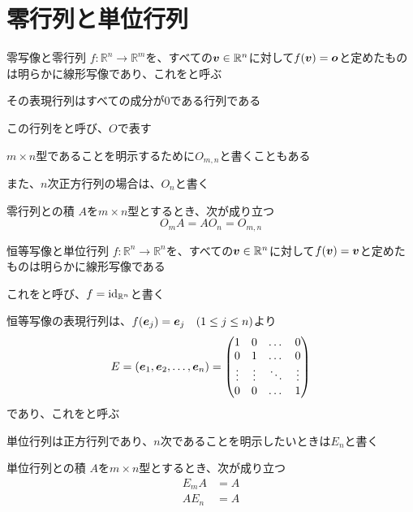 \documentclass[../../../topic_linear-algebra]{subfiles}
\begin{document}
\sectionline
\section{零行列と単位行列}

\begin{mindflow}
\end{mindflow}

\begin{definition*}{零写像と零行列}
  $f\colon \mathbb{R}^n \to \mathbb{R}^m$を、すべての$\vb*{v} \in \mathbb{R}^n$に対して$f(\vb*{v}) = \vb*{o}$と定めたものは明らかに線形写像であり、これをと呼ぶ

  その表現行列はすべての成分が0である行列である

  この行列をと呼び、$O$で表す
\end{definition*}

$m \times n$型であることを明示するために$O_{m,n}$と書くこともある

また、$n$次正方行列の場合は、$O_n$と書く

\begin{theorem*}{零行列との積}
  $A$を$m \times n$型とするとき、次が成り立つ
  \begin{equation*}
    O_m A = A O_n = O_{m,n}
  \end{equation*}
\end{theorem*}

\sectionline

\begin{definition*}{恒等写像と単位行列}
  $f\colon \mathbb{R}^n \to \mathbb{R}^n$を、すべての$\vb*{v} \in \mathbb{R}^n$に対して$f(\vb*{v}) = \vb*{v}$と定めたものは明らかに線形写像である

  これをと呼び、$f = \operatorname{id}_{\mathbb{R}^n}$と書く

  恒等写像の表現行列は、$f(\vb*{e}_j) = \vb*{e}_j \quad (1 \leq j \leq n)$より
  \begin{equation*}
    E = (\vb*{e}_1, \vb*{e}_2, \dots, \vb*{e}_n) = \begin{pmatrix}
      1      & 0      & \dots  & 0      \\
      0      & 1      & \dots  & 0      \\
      \vdots & \vdots & \ddots & \vdots \\
      0      & 0      & \dots  & 1
    \end{pmatrix}
  \end{equation*}
  であり、これをと呼ぶ
\end{definition*}

単位行列は正方行列であり、$n$次であることを明示したいときは$E_n$と書く

\begin{theorem*}{単位行列との積}
  $A$を$m \times n$型とするとき、次が成り立つ
  \begin{align*}
    E_mA & = A \\
    AE_n & = A
  \end{align*}
\end{theorem*}
\end{document}
